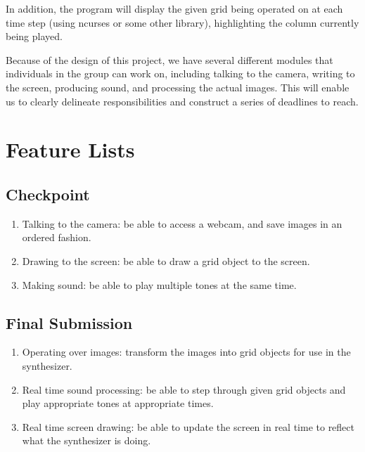 \documentclass{article}
\begin{document}
In addition, the program will display the given grid being
operated on at each time step (using ncurses or some other
library), highlighting the column currently being played.

Because of the design of this project, we have several different
modules that individuals in the group can work on, including
talking to the camera, writing to the screen, producing sound,
and processing the actual images. This will enable us to clearly
delineate responsibilities and construct a series of deadlines to
reach.


\section{Feature Lists} %
\label{sec:feature_lists}

\subsection{Checkpoint} %
\label{sub:checkpoint}

\begin{enumerate}

\item Talking to the camera: be able to access a webcam, and save
images in an ordered fashion.

\item Drawing to the screen: be able to draw a grid object to the
screen.

\item Making sound: be able to play multiple tones at the same
time.

\end{enumerate}


\subsection{Final Submission} %
\label{sub:final_submission}

\begin{enumerate}

\item Operating over images: transform the images into grid
objects for use in the synthesizer.

\item Real time sound processing: be able to step through given
grid objects and play appropriate tones at appropriate times.

\item Real time screen drawing: be able to update the screen in
real time to reflect what the synthesizer is doing.

\end{enumerate}
\end{document}
